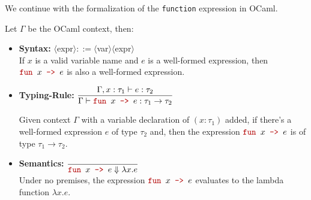 \newpage 

\noindent
We continue with the formalization of the \texttt{function} expression in OCaml.
\begin{Def}

    \label{def:func}
    
    Let $\Gamma$ be the OCaml context, then:
    \begin{itemize}
        \item \textbf{Syntax:} \LARGE $\langle$expr$\rangle::=$$\langle$var$\rangle$\texttr{ -> }$\langle$expr$\rangle$\normalsize\\

        \vspace{-.5em}
        \noindent
        If $x$ is a valid variable name and $e$ is a well-formed expression, then $\texttr{fun }x\texttr{ -> }e$ is also a well-formed expression.
        
        \item \textbf{Typing-Rule:} \LARGE $\dfrac{\Gamma,x:\tau_1\vdash e:\tau_2}{\Gamma\vdash\texttr{fun }x\texttr{ -> }e:\tau_1\rightarrow\tau_2}$ \normalsize
        
        \noindent
        Given context $\Gamma$ with a variable declaration of $(x:\tau_1)$ added, if there's a well-formed expression $e$ of type $\tau_2$ and, then the expression $\texttr{fun }x\texttr{ -> }e$ is of type $\tau_1\rightarrow\tau_2$.

        \item \textbf{Semantics:} \LARGE $\dfrac{}{\texttr{fun }x\texttr{ -> }e\Downarrow\lambda x.e}$ \normalsize\\
        
        \noindent
        Under no premises, the expression $\texttr{fun }x\texttr{ -> }e$ evaluates to the lambda function $\lambda x.e$.
    \end{itemize}
\end{Def}


